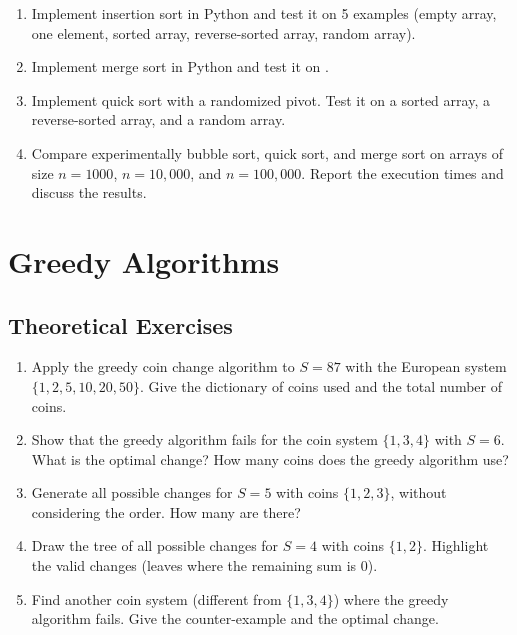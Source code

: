 \documentclass[11pt,a4paper]{article}
\newcommand{\code}[1]{\texttt{\detokenize{#1}}}
\newcommand{\easy}{$\star$}
\newcommand{\medium}{$\star\star$}
\begin{document}
\begin{enumerate}[label=\textbf{4.\arabic*}, start=7]

    \item[\easy] Implement insertion sort in Python and test it on 5 examples (empty array, one element, sorted array, reverse-sorted array, random array).

    \item[\medium] Implement merge sort in Python and test it on \code{[38, 27, 43, 3, 9, 82, 10]}.

    \item[\medium] Implement quick sort with a randomized pivot. Test it on a sorted array, a reverse-sorted array, and a random array.

    \item[\medium] Compare experimentally bubble sort, quick sort, and merge sort on arrays of size $n = 1000$, $n = 10{,}000$, and $n = 100{,}000$. Report the execution times and discuss the results.

\end{enumerate}

\section{Greedy Algorithms}

\subsection{Theoretical Exercises}

\begin{enumerate}[label=\textbf{5.\arabic*}]

    \item[\easy] Apply the greedy coin change algorithm to $S = 87$ with the European system $\{1, 2, 5, 10, 20, 50\}$. Give the dictionary of coins used and the total number of coins.

    \item[\easy] Show that the greedy algorithm fails for the coin system $\{1, 3, 4\}$ with $S = 6$. What is the optimal change? How many coins does the greedy algorithm use?

    \item[\medium] Generate all possible changes for $S = 5$ with coins $\{1, 2, 3\}$, without considering the order. How many are there?

    \item[\medium] Draw the tree of all possible changes for $S = 4$ with coins $\{1, 2\}$. Highlight the valid changes (leaves where the remaining sum is 0).

    \item[\medium] Find another coin system (different from $\{1, 3, 4\}$) where the greedy algorithm fails. Give the counter-example and the optimal change.

\end{enumerate}
\end{document}
